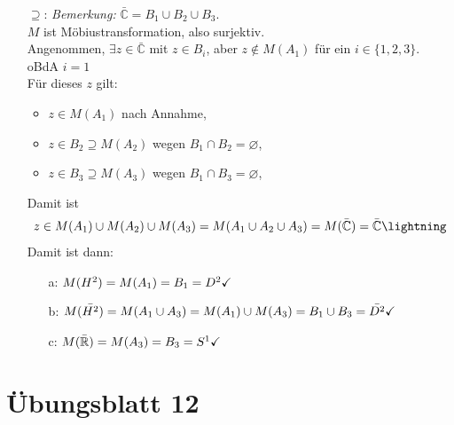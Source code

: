 \begin{problem*}[4]
\begin{itemize}
    \item[\( \supseteq \):] \emph{Bemerkung:} \( \bar{\mathbb{C}} = B_1 \cup B_2 \cup B_3 \). \\
    \( M \) ist Möbiustransformation, also surjektiv. \\
    Angenommen, \( \exists z \in \bar{\mathbb{C}} \) mit \( z \in B_i \), aber \( z \notin M(A_1) \) für ein \( i \in \{ 1, 2, 3 \} \). \\
    oBdA \( i = 1 \) \\
    Für dieses \( z \) gilt:
    \begin{itemize}
      \item \( z \in M(A_1) \) nach Annahme,
      \item \( z \in B_2 \supseteq M(A_2) \) wegen \( B_1 \cap B_2 = \varnothing \),
      \item \( z \in B_3 \supseteq M(A_3) \) wegen \( B_1 \cap B_3 = \varnothing \),
    \end{itemize}
    Damit ist
    \begin{equation*}
      z \in M(A_1) \cup M(A_2) \cup M(A_3) = M(A_1 \cup A_2 \cup A_3) = M(\bar{\mathbb{C}}) = \bar{\mathbb{C}} \hfill \lightning
    \end{equation*}
    Damit ist dann:
    \begin{itemize}
      \item[a:] \( M(H^2) = M(A_1) = B_1 = D^2 \hfill \checkmark \)
      \item[b:] \( M(\bar{H^2}) = M(A_1 \cup A_3) = M(A_1) \cup M(A_3) = B_1 \cup B_3 = \bar{D^2} \hfill \checkmark \)
      \item[c:] \( M(\bar{ \mathbb{R}}) = M(A_3) = B_3 = S^1 \hfill \checkmark \)
    \end{itemize}
  \end{itemize}
\end{problem*}



%
\section{Übungsblatt 12}

